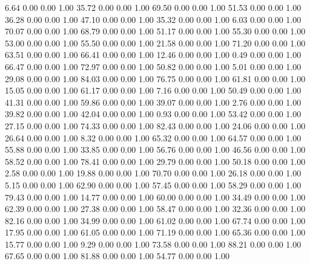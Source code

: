     6.64   0.00   0.00   1.00
   35.72   0.00   0.00   1.00
   69.50   0.00   0.00   1.00
   51.53   0.00   0.00   1.00
   36.28   0.00   0.00   1.00
   47.10   0.00   0.00   1.00
   35.32   0.00   0.00   1.00
    6.03   0.00   0.00   1.00
   70.07   0.00   0.00   1.00
   68.79   0.00   0.00   1.00
   51.17   0.00   0.00   1.00
   55.30   0.00   0.00   1.00
   53.00   0.00   0.00   1.00
   55.50   0.00   0.00   1.00
   21.58   0.00   0.00   1.00
   71.20   0.00   0.00   1.00
   63.51   0.00   0.00   1.00
   66.41   0.00   0.00   1.00
   12.46   0.00   0.00   1.00
    0.49   0.00   0.00   1.00
   66.47   0.00   0.00   1.00
   72.97   0.00   0.00   1.00
   50.82   0.00   0.00   1.00
    5.01   0.00   0.00   1.00
   29.08   0.00   0.00   1.00
   84.03   0.00   0.00   1.00
   76.75   0.00   0.00   1.00
   61.81   0.00   0.00   1.00
   15.05   0.00   0.00   1.00
   61.17   0.00   0.00   1.00
    7.16   0.00   0.00   1.00
   50.49   0.00   0.00   1.00
   41.31   0.00   0.00   1.00
   59.86   0.00   0.00   1.00
   39.07   0.00   0.00   1.00
    2.76   0.00   0.00   1.00
   39.82   0.00   0.00   1.00
   42.04   0.00   0.00   1.00
    0.93   0.00   0.00   1.00
   53.42   0.00   0.00   1.00
   27.15   0.00   0.00   1.00
   74.33   0.00   0.00   1.00
   82.43   0.00   0.00   1.00
   24.06   0.00   0.00   1.00
   26.64   0.00   0.00   1.00
    8.32   0.00   0.00   1.00
   65.32   0.00   0.00   1.00
   64.57   0.00   0.00   1.00
   55.88   0.00   0.00   1.00
   33.85   0.00   0.00   1.00
   56.76   0.00   0.00   1.00
   46.56   0.00   0.00   1.00
   58.52   0.00   0.00   1.00
   78.41   0.00   0.00   1.00
   29.79   0.00   0.00   1.00
   50.18   0.00   0.00   1.00
    2.58   0.00   0.00   1.00
   19.88   0.00   0.00   1.00
   70.70   0.00   0.00   1.00
   26.18   0.00   0.00   1.00
    5.15   0.00   0.00   1.00
   62.90   0.00   0.00   1.00
   57.45   0.00   0.00   1.00
   58.29   0.00   0.00   1.00
   79.43   0.00   0.00   1.00
   14.77   0.00   0.00   1.00
   60.00   0.00   0.00   1.00
   34.49   0.00   0.00   1.00
   62.39   0.00   0.00   1.00
   27.38   0.00   0.00   1.00
   58.47   0.00   0.00   1.00
   32.36   0.00   0.00   1.00
   82.16   0.00   0.00   1.00
   34.99   0.00   0.00   1.00
   61.02   0.00   0.00   1.00
   67.74   0.00   0.00   1.00
   17.95   0.00   0.00   1.00
   61.05   0.00   0.00   1.00
   71.19   0.00   0.00   1.00
   65.36   0.00   0.00   1.00
   15.77   0.00   0.00   1.00
    9.29   0.00   0.00   1.00
   73.58   0.00   0.00   1.00
   88.21   0.00   0.00   1.00
   67.65   0.00   0.00   1.00
   81.88   0.00   0.00   1.00
   54.77   0.00   0.00   1.00
